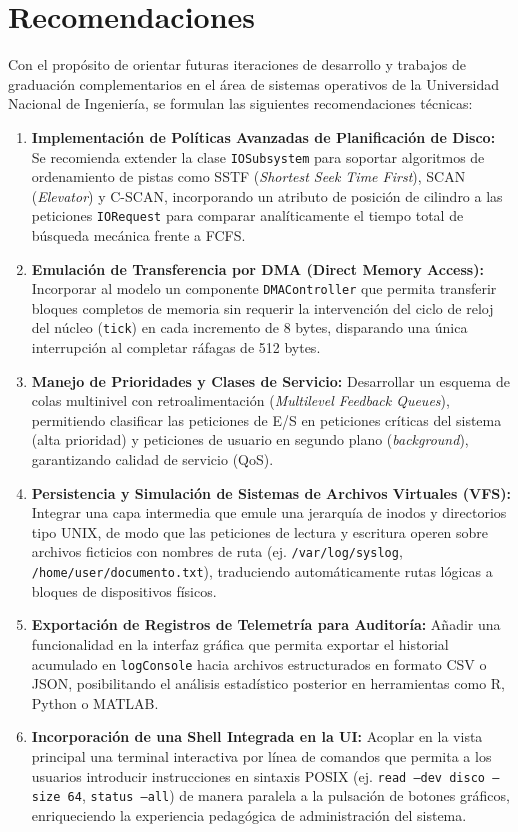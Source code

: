 \documentclass[11pt,letterpaper]{article}
\begin{document}
\section{Recomendaciones}

Con el propósito de orientar futuras iteraciones de desarrollo y trabajos de graduación complementarios en el área de sistemas operativos de la Universidad Nacional de Ingeniería, se formulan las siguientes recomendaciones técnicas:

\begin{enumerate}
    \item \textbf{Implementación de Políticas Avanzadas de Planificación de Disco:} Se recomienda extender la clase \texttt{IOSubsystem} para soportar algoritmos de ordenamiento de pistas como SSTF (\textit{Shortest Seek Time First}), SCAN (\textit{Elevator}) y C-SCAN, incorporando un atributo de posición de cilindro a las peticiones \texttt{IORequest} para comparar analíticamente el tiempo total de búsqueda mecánica frente a FCFS.
    \item \textbf{Emulación de Transferencia por DMA (Direct Memory Access):} Incorporar al modelo un componente \texttt{DMAController} que permita transferir bloques completos de memoria sin requerir la intervención del ciclo de reloj del núcleo (\texttt{tick}) en cada incremento de 8 bytes, disparando una única interrupción al completar ráfagas de 512 bytes.
    \item \textbf{Manejo de Prioridades y Clases de Servicio:} Desarrollar un esquema de colas multinivel con retroalimentación (\textit{Multilevel Feedback Queues}), permitiendo clasificar las peticiones de E/S en peticiones críticas del sistema (alta prioridad) y peticiones de usuario en segundo plano (\textit{background}), garantizando calidad de servicio (QoS).
    \item \textbf{Persistencia y Simulación de Sistemas de Archivos Virtuales (VFS):} Integrar una capa intermedia que emule una jerarquía de inodos y directorios tipo UNIX, de modo que las peticiones de lectura y escritura operen sobre archivos ficticios con nombres de ruta (ej. \texttt{/var/log/syslog}, \texttt{/home/user/documento.txt}), traduciendo automáticamente rutas lógicas a bloques de dispositivos físicos.
    \item \textbf{Exportación de Registros de Telemetría para Auditoría:} Añadir una funcionalidad en la interfaz gráfica que permita exportar el historial acumulado en \texttt{logConsole} hacia archivos estructurados en formato CSV o JSON, posibilitando el análisis estadístico posterior en herramientas como R, Python o MATLAB.
    \item \textbf{Incorporación de una Shell Integrada en la UI:} Acoplar en la vista principal una terminal interactiva por línea de comandos que permita a los usuarios introducir instrucciones en sintaxis POSIX (ej. \texttt{read --dev disco --size 64}, \texttt{status --all}) de manera paralela a la pulsación de botones gráficos, enriqueciendo la experiencia pedagógica de administración del sistema.
\end{enumerate}
\end{document}

